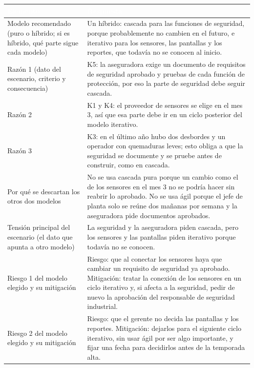\begin{center}
\small
\begin{tabularx}{\textwidth}{|>{\raggedright\arraybackslash}p{4.5cm}|L|}
\hline
{}\textcolor{white}{\textbf{Elemento}} & \textcolor{white}{\textbf{Respuesta}} \\ \hline
Modelo recomendado (puro o híbrido; si es híbrido, qué parte sigue cada modelo) & Un híbrido: cascada para las funciones de seguridad, porque probablemente no cambien en el futuro, e iterativo para los sensores, las pantallas y los reportes, que todavía no se conocen al inicio. \\ \hline
Razón 1 (dato del escenario, criterio y consecuencia) & K5: la aseguradora exige un documento de requisitos de seguridad aprobado y pruebas de cada función de protección, por eso la parte de seguridad debe seguir cascada. \\ \hline
Razón 2 & K1 y K4: el proveedor de sensores se elige en el mes 3, así que esa parte debe ir en un ciclo posterior del modelo iterativo. \\ \hline
Razón 3 & K3: en el último año hubo dos desbordes y un operador con quemaduras leves; esto obliga a que la seguridad se documente y se pruebe antes de construir, como en cascada. \\ \hline
Por qué se descartan los otros dos modelos & No se usa cascada pura porque un cambio como el de los sensores en el mes 3 no se podría hacer sin reabrir lo aprobado. No se usa ágil porque el jefe de planta solo se reúne dos mañanas por semana y la aseguradora pide documentos aprobados. \\ \hline
Tensión principal del escenario (el dato que apunta a otro modelo) & La seguridad y la aseguradora piden cascada, pero los sensores y las pantallas piden iterativo porque todavía no se conocen. \\ \hline
Riesgo 1 del modelo elegido y su mitigación & Riesgo: que al conectar los sensores haya que cambiar un requisito de seguridad ya aprobado. Mitigación: tratar la conexión de los sensores en un ciclo iterativo y, si afecta a la seguridad, pedir de nuevo la aprobación del responsable de seguridad industrial. \\ \hline
Riesgo 2 del modelo elegido y su mitigación & Riesgo: que el gerente no decida las pantallas y los reportes. Mitigación: dejarlos para el siguiente ciclo iterativo, sin usar ágil por ser algo importante, y fijar una fecha para decidirlos antes de la temporada alta. \\ \hline
\end{tabularx}
\end{center}
